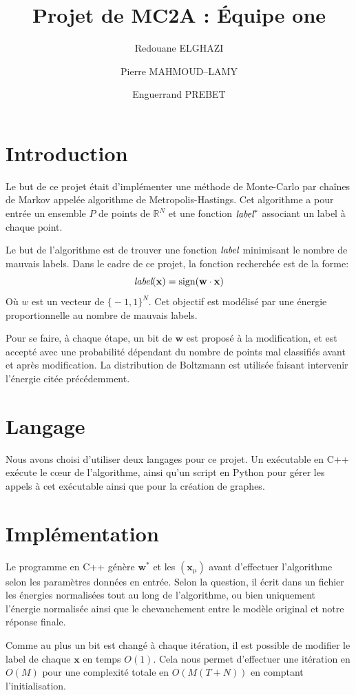 \documentclass[twocolumn]{article}
\date{}
\author{Redouane ELGHAZI \and Pierre MAHMOUD--LAMY \and Enguerrand PREBET}
\title{Projet de MC2A : Équipe one}
\begin{document}
	\maketitle
	\section{Introduction}
		Le but de ce projet était d'implémenter une méthode de Monte-Carlo par chaînes de Markov appelée algorithme de Metropolis-Hastings. Cet algorithme a pour entrée un ensemble $P$ de points de $\mathbb{R}^N$ et une fonction $\emph{label}^*$ associant un label à chaque point.
		
		Le but de l'algorithme est de trouver une fonction $\emph{label}$ minimisant le nombre de mauvais labels. Dans le cadre de ce projet, la fonction recherchée est de la forme:
		$$\emph{label}(\mathbf{x}) = \text{sign}(\mathbf{w}\cdot \mathbf{x})$$
		Où $w$ est un vecteur de $\big\{{-}1,1\big\}^N$. Cet objectif est modélisé par une énergie proportionnelle au nombre de mauvais labels.
		
		Pour se faire, à chaque étape, un bit de $\mathbf{w}$ est proposé à la modification, et est accepté avec une probabilité dépendant du nombre de points mal classifiés avant et après modification. La distribution de Boltzmann est utilisée faisant intervenir l'énergie citée précédemment.
	\section{Langage}
		Nous avons choisi d'utiliser deux langages pour ce projet. Un exécutable en C++ exécute le cœur de l'algorithme, ainsi qu'un script en Python pour gérer les appels à cet exécutable ainsi que pour la création de graphes.
		
	\section{Implémentation}
		Le programme en C++ génère $\mathbf{w}^*$ et les $(\mathbf{x}_\mu)$ avant d'effectuer l'algorithme selon les paramètres données en entrée. Selon la question, il écrit dans un fichier les énergies normalisées tout au long de l'algorithme, ou bien uniquement l'énergie normalisée ainsi que le chevauchement entre le modèle original et notre réponse finale.
		
		Comme au plus un bit est changé à chaque itération, il est possible de modifier le label de chaque $\mathbf{x}$ en temps $O(1)$. Cela nous permet d'effectuer une itération en $O(M)$ pour une complexité totale en $O(M(T + N))$ en comptant l'initialisation.
		
\end{document}
